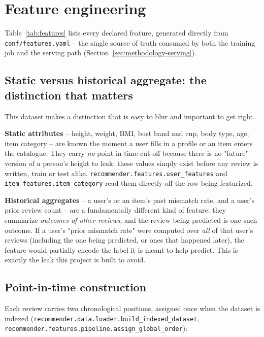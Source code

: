 \section{Feature engineering}
\label{sec:feature-engineering}

Table~\ref{tab:features} lists every declared feature, generated directly
from \texttt{conf/features.yaml} -- the single source of truth consumed by
both the training job and the serving path
(Section~\ref{sec:methodology-serving}).



\subsection{Static versus historical aggregate: the distinction that matters}

This dataset makes a distinction that is easy to blur and important to get
right.

\textbf{Static attributes} -- height, weight, BMI, bust band and cup, body
type, age, item category -- are known the moment a user fills in a profile
or an item enters the catalogue. They carry \emph{no} point-in-time
cut-off because there is no "future" version of a person's height to leak:
these values simply exist before any review is written, train or test
alike. \texttt{recommender.features.user\_features} and
\texttt{item\_features.item\_category} read them directly off the row being
featurized.

\textbf{Historical aggregates} -- a user's or an item's past mismatch rate,
and a user's prior review count -- are a fundamentally different kind of
feature: they summarize \emph{outcomes of other reviews}, and the review
being predicted is one such outcome. If a user's "prior mismatch rate" were
computed over \emph{all} of that user's reviews (including the one being
predicted, or ones that happened later), the feature would partially encode
the label it is meant to help predict. This is exactly the leak this project
is built to avoid.

\subsection{Point-in-time construction}

Each review carries two chronological positions, assigned once when the
dataset is indexed (\texttt{recommender.data.loader.build\_indexed\_dataset},
\texttt{recommender.features.pipeline.assign\_global\_order}):

